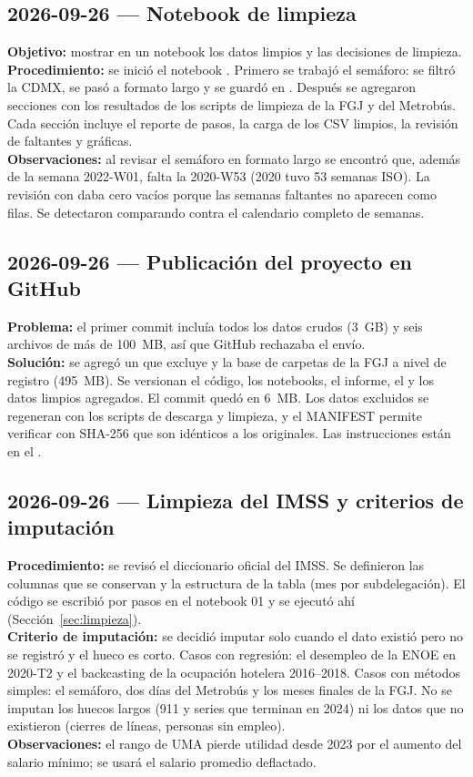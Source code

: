 \subsection{2026-09-26 --- Notebook de limpieza}
\textbf{Objetivo:} mostrar en un notebook los datos limpios y las decisiones de limpieza.\\
\textbf{Procedimiento:} se inició el notebook . Primero
se trabajó el semáforo: se filtró la CDMX, se pasó a formato largo y se guardó en
. Después se agregaron secciones con los resultados de
los scripts de limpieza de la FGJ y del Metrobús. Cada sección incluye el reporte de pasos, la carga de
los CSV limpios, la revisión de faltantes y gráficas.\\
\textbf{Observaciones:} al revisar el semáforo en formato largo se encontró que, además de la semana
2022-W01, falta la 2020-W53 (2020 tuvo 53 semanas ISO). La revisión con  daba cero
vacíos porque las semanas faltantes no aparecen como filas. Se detectaron comparando contra el
calendario completo de semanas.

\subsection{2026-09-26 --- Publicación del proyecto en GitHub}
\textbf{Problema:} el primer commit incluía todos los datos crudos (3~GB) y seis archivos de más de
100~MB, así que GitHub rechazaba el envío.\\
\textbf{Solución:} se agregó un  que excluye  y la base de
carpetas de la FGJ a nivel de registro (495~MB). Se versionan el código, los notebooks, el informe, el
 y los datos limpios agregados. El commit quedó en 6~MB. Los datos excluidos se
regeneran con los scripts de descarga y limpieza, y el MANIFEST permite verificar con SHA-256 que son
idénticos a los originales. Las instrucciones están en el .

\subsection{2026-09-26 --- Limpieza del IMSS y criterios de imputación}
\textbf{Procedimiento:} se revisó el diccionario oficial del IMSS. Se definieron las columnas que se
conservan y la estructura de la tabla (mes por subdelegación). El código se escribió por pasos en el
notebook 01 y se ejecutó ahí (Sección~\ref{sec:limpieza}).\\
\textbf{Criterio de imputación:} se decidió imputar solo cuando el dato existió pero no se registró y
el hueco es corto. Casos con regresión: el desempleo de la ENOE en 2020-T2 y el backcasting de la
ocupación hotelera 2016--2018. Casos con métodos simples: el semáforo, dos días del Metrobús y los
meses finales de la FGJ. No se imputan los huecos largos (911 y series que terminan en 2024) ni los
datos que no existieron (cierres de líneas, personas sin empleo).\\
\textbf{Observaciones:} el rango de UMA pierde utilidad desde 2023 por el aumento del salario mínimo;
se usará el salario promedio deflactado.

